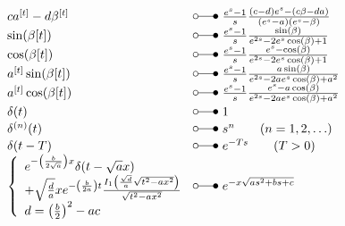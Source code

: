 \begin{footnotesize}
\[\begin{array}{@{}l@{ ~ \laplace ~ }l@{}}
c a^{[t]} - d \beta^{[t]} &
    \frac{e^s - 1}{s} \frac{(c - d) e^s - (c \beta - d a)}{(e^s - a) (e^s - \beta)} \\
\sin(\beta[t]) &
    \frac{e^s - 1}{s} \frac{\sin(\beta)}{e^{2s} - 2 e^s \cos(\beta) + 1} \\
\cos(\beta [t]) &
    \frac{e^s - 1}{s} \frac{e^s - \cos(\beta)}{e^{2s} - 2 e^s \cos(\beta) + 1} \\
a^{[t]} \sin(\beta [t]) &
    \frac{e^s - 1}{s} \frac{a \sin(\beta)}{e^{2s} - 2 a e^s \cos(\beta) + a^2} \\
a^{[t]} \cos(\beta [t]) &
    \frac{e^s - 1}{s} \frac{e^s - a \cos(\beta)}{e^{2s} - 2 a e^s \cos(\beta) + a^2} \\
\delta(t) &
    1 \\
\delta^{(n)}(t) &
    s^n \qquad (n = 1, 2, \ldots) \\
\delta(t - T) &
    e^{-Ts} \qquad (T > 0) \\
\left\lbrace\begin{array}{l}
e^{-\left(\frac{b}{2 \sqrt{a}}\right) x} \delta(t - \sqrt{a} x) \\
+ \sqrt{\frac{d}{a}} x e^{-\left(\frac{b}{2a}\right) t} \frac{I_1 \left(\frac{\sqrt{d}}{a} \sqrt{t^2 - a x^2}\right)}{\sqrt{t^2 - a x^2}} \\
d = \left(\frac{b}{2}\right)^2 - a c \\
\end{array}\right. &
    e^{-x \sqrt{as^2 + bs + c}} \\
\end{array} \]


\end{footnotesize}
